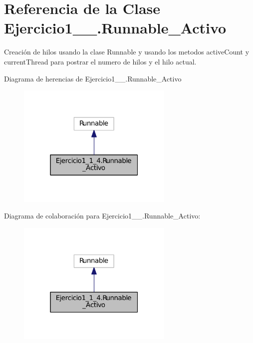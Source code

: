 \hypertarget{class_ejercicio1__1__4_1_1_runnable___activo}{}\section{Referencia de la Clase Ejercicio1\+\_\+\_.\+Runnable\+\_\+\+Activo}
\label{class_ejercicio1__1__4_1_1_runnable___activo}


Creación de hilos usando la clase Runnable y usando los metodos active\+Count y current\+Thread para postrar el numero de hilos y el hilo actual.  




Diagrama de herencias de Ejercicio1\+\_\+\_.\+Runnable\+\_\+\+Activo
\nopagebreak
\begin{figure}[H]
\begin{center}
\leavevmode
\includegraphics[width=211pt]{class_ejercicio1__1__4_1_1_runnable___activo__inherit__graph}
\end{center}
\end{figure}


Diagrama de colaboración para Ejercicio1\+\_\+\_.\+Runnable\+\_\+\+Activo\+:
\nopagebreak
\begin{figure}[H]
\begin{center}
\leavevmode
\includegraphics[width=211pt]{class_ejercicio1__1__4_1_1_runnable___activo__coll__graph}
\end{center}
\end{figure}
